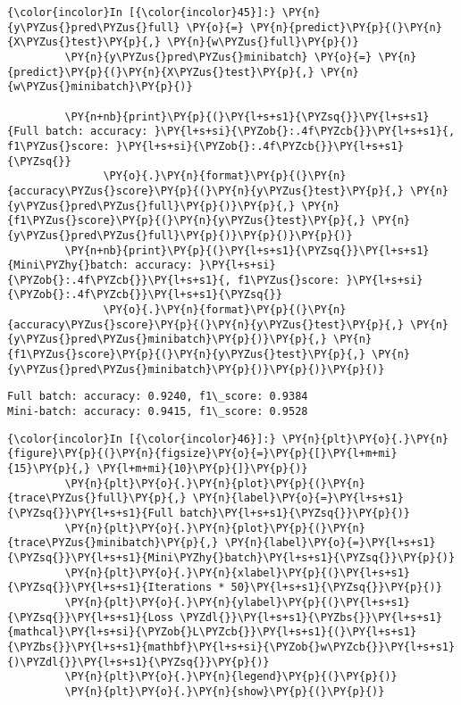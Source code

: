     \begin{Verbatim}[commandchars=\\\{\}]
{\color{incolor}In [{\color{incolor}45}]:} \PY{n}{y\PYZus{}pred\PYZus{}full} \PY{o}{=} \PY{n}{predict}\PY{p}{(}\PY{n}{X\PYZus{}test}\PY{p}{,} \PY{n}{w\PYZus{}full}\PY{p}{)}
         \PY{n}{y\PYZus{}pred\PYZus{}minibatch} \PY{o}{=} \PY{n}{predict}\PY{p}{(}\PY{n}{X\PYZus{}test}\PY{p}{,} \PY{n}{w\PYZus{}minibatch}\PY{p}{)}
         
         \PY{n+nb}{print}\PY{p}{(}\PY{l+s+s1}{\PYZsq{}}\PY{l+s+s1}{Full batch: accuracy: }\PY{l+s+si}{\PYZob{}:.4f\PYZcb{}}\PY{l+s+s1}{, f1\PYZus{}score: }\PY{l+s+si}{\PYZob{}:.4f\PYZcb{}}\PY{l+s+s1}{\PYZsq{}}
               \PY{o}{.}\PY{n}{format}\PY{p}{(}\PY{n}{accuracy\PYZus{}score}\PY{p}{(}\PY{n}{y\PYZus{}test}\PY{p}{,} \PY{n}{y\PYZus{}pred\PYZus{}full}\PY{p}{)}\PY{p}{,} \PY{n}{f1\PYZus{}score}\PY{p}{(}\PY{n}{y\PYZus{}test}\PY{p}{,} \PY{n}{y\PYZus{}pred\PYZus{}full}\PY{p}{)}\PY{p}{)}\PY{p}{)}
         \PY{n+nb}{print}\PY{p}{(}\PY{l+s+s1}{\PYZsq{}}\PY{l+s+s1}{Mini\PYZhy{}batch: accuracy: }\PY{l+s+si}{\PYZob{}:.4f\PYZcb{}}\PY{l+s+s1}{, f1\PYZus{}score: }\PY{l+s+si}{\PYZob{}:.4f\PYZcb{}}\PY{l+s+s1}{\PYZsq{}}
               \PY{o}{.}\PY{n}{format}\PY{p}{(}\PY{n}{accuracy\PYZus{}score}\PY{p}{(}\PY{n}{y\PYZus{}test}\PY{p}{,} \PY{n}{y\PYZus{}pred\PYZus{}minibatch}\PY{p}{)}\PY{p}{,} \PY{n}{f1\PYZus{}score}\PY{p}{(}\PY{n}{y\PYZus{}test}\PY{p}{,} \PY{n}{y\PYZus{}pred\PYZus{}minibatch}\PY{p}{)}\PY{p}{)}\PY{p}{)}
\end{Verbatim}

    \begin{Verbatim}[commandchars=\\\{\}]
Full batch: accuracy: 0.9240, f1\_score: 0.9384
Mini-batch: accuracy: 0.9415, f1\_score: 0.9528

    \end{Verbatim}

    \begin{Verbatim}[commandchars=\\\{\}]
{\color{incolor}In [{\color{incolor}46}]:} \PY{n}{plt}\PY{o}{.}\PY{n}{figure}\PY{p}{(}\PY{n}{figsize}\PY{o}{=}\PY{p}{[}\PY{l+m+mi}{15}\PY{p}{,} \PY{l+m+mi}{10}\PY{p}{]}\PY{p}{)}
         \PY{n}{plt}\PY{o}{.}\PY{n}{plot}\PY{p}{(}\PY{n}{trace\PYZus{}full}\PY{p}{,} \PY{n}{label}\PY{o}{=}\PY{l+s+s1}{\PYZsq{}}\PY{l+s+s1}{Full batch}\PY{l+s+s1}{\PYZsq{}}\PY{p}{)}
         \PY{n}{plt}\PY{o}{.}\PY{n}{plot}\PY{p}{(}\PY{n}{trace\PYZus{}minibatch}\PY{p}{,} \PY{n}{label}\PY{o}{=}\PY{l+s+s1}{\PYZsq{}}\PY{l+s+s1}{Mini\PYZhy{}batch}\PY{l+s+s1}{\PYZsq{}}\PY{p}{)}
         \PY{n}{plt}\PY{o}{.}\PY{n}{xlabel}\PY{p}{(}\PY{l+s+s1}{\PYZsq{}}\PY{l+s+s1}{Iterations * 50}\PY{l+s+s1}{\PYZsq{}}\PY{p}{)}
         \PY{n}{plt}\PY{o}{.}\PY{n}{ylabel}\PY{p}{(}\PY{l+s+s1}{\PYZsq{}}\PY{l+s+s1}{Loss \PYZdl{}}\PY{l+s+s1}{\PYZbs{}}\PY{l+s+s1}{mathcal}\PY{l+s+si}{\PYZob{}L\PYZcb{}}\PY{l+s+s1}{(}\PY{l+s+s1}{\PYZbs{}}\PY{l+s+s1}{mathbf}\PY{l+s+si}{\PYZob{}w\PYZcb{}}\PY{l+s+s1}{)\PYZdl{}}\PY{l+s+s1}{\PYZsq{}}\PY{p}{)}
         \PY{n}{plt}\PY{o}{.}\PY{n}{legend}\PY{p}{(}\PY{p}{)}
         \PY{n}{plt}\PY{o}{.}\PY{n}{show}\PY{p}{(}\PY{p}{)}
\end{Verbatim}

